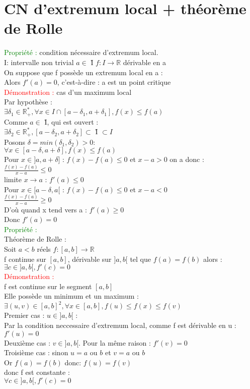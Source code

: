 \documentclass{article}
\begin{document}
\section{CN d'extremum local + théorème de Rolle}
\textcolor{green}{Propriété :} condition nécessaire d'extremum local. \\ 
I: intervalle non trivial $a \in$ \r{I}  $f: I \rightarrow \mathbb{R}$ dérivable en a \\ 
On suppose que f possède un extremum local en a : \\
Alors $f'(a)=0$, c'est-à-dire : a est un point critique \\
\textcolor{red}{Démonstration :} cas d'un maximum local \\ 
Par hypothèse : \\ 
$\exists \delta_1 \in \mathbb{R}^*_+, \forall x \in I \cap [a-\delta_1,a+ \delta_1],f(x)\leq f(a)$ \\ 
Comme $a \in$ \r{I}, qui est ouvert : \\ 
$\exists \delta_2 \in \mathbb{R}^*_+, [a- \delta_2, a+ \delta_2] \subset$ \r{I} $\subset I$ \\ 
Posons $ \delta = min(\delta_1,\delta_2)>0$: \\ 
$\forall x \in [a- \delta , a+ \delta ], f(x) \leq f(a)$ \\ 
Pour $x \in ]a,a+ \delta ]$ : $f(x)-f(a)\leq 0$ et $x-a>0$ on a donc : \\
$\frac{f(x)-f(a)}{x-a} \leq 0$ \\ 
limite $x \rightarrow a$ : $f'(a) \leq 0$ \\ 
Pour $x \in [a- \delta, a[$ : $f(x)-f(a)\leq 0$ et $x-a<0$ \\ 
$\frac{f(x)-f(a)}{x-a} \geq 0$ \\ 
D'où quand x tend vers a : $f'(a)\geq 0$ \\ 
Donc $f'(a)=0$ \\ 
\textcolor{green}{Propriété :} \\ 
Théorème de Rolle : \\ 
Soit $a<b$ réels $f:[a,b] \rightarrow \mathbb{R}$ \\ 
f continue sur $[a,b]$, dérivable sur $]a,b[$ tel que $f(a)=f(b)$ alors : \\ 
\indent $\exists c \in ]a,b[, f'(c)=0$ \\ 
\textcolor{red}{Démonstration :} \\ 
f est continue sur le segment $[a,b]$ \\ 
Elle possède un minimum et un maximum : \\ 
$\exists (u,v) \in [a,b]^2, \forall x \in [a,b], f(u) \leq f(x) \leq f(v)$ \\ 
Premier cas : $u \in ]a,b[$ : \\ 
Par la condition neccessaire d'extremum local, comme f est dérivable en u : \\ 
$f'(u)=0$ \\ 
Deuxième cas : $v \in ]a,b[$. Pour la même raison : $f'(v)=0$ \\
Troisième cas : sinon $u=a$ ou $b$ et $v=a$ ou $b$ \\ 
Or $f(a)=f(b)$ donc: $f(u)=f(v)$ \\ 
donc f est constante : \\ 
$\forall c \in ]a,b[, f'(c)=0$
\end{document}
